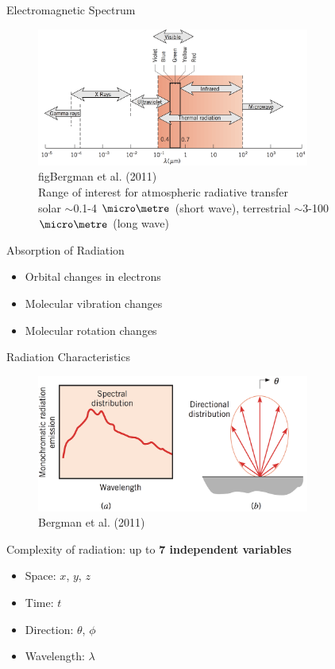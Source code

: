 \begin{frame}{Electromagnetic Spectrum}

\begin{figure}
	\includegraphics[width=0.8\textwidth]{fig4}
	\centering \tiny~\\figBergman et al. (2011)\\ \centering \small Range of interest for atmospheric radiative transfer\\solar $\sim$0.1-4 $\micro\metre$ (short wave), terrestrial $\sim$3-100 $\micro\metre$ (long wave)
\end{figure}

Absorption of Radiation
\begin{itemize}
	\item Orbital changes in electrons
	\item Molecular vibration changes
	\item Molecular rotation changes
\end{itemize}
\end{frame}

\begin{frame}{Radiation Characteristics}

\begin{figure}
	\includegraphics[width=0.8\textwidth]{fig5}
	\centering \tiny~\\Bergman et al. (2011)
\end{figure}

Complexity of radiation: up to \textbf{7 independent variables}
\begin{itemize}
	\item Space: $x$, $y$, $z$
	\item Time: $t$
	\item Direction: $\theta$, $\phi$
	\item Wavelength: $\lambda$
\end{itemize}
\end{frame}

